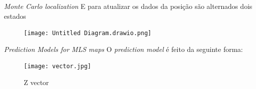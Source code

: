 \begin{frame}[c]{\textit{Monte Carlo localization}}
    E para atualizar os dados da posição são alternados dois estados
    \newline

    \begin{center}
        \begin{figure}
            \texttt{[image: Untitled Diagram.drawio.png]}
        \end{figure}
    \end{center}

\end{frame}


\begin{frame}[c]{\textit{Prediction Models for MLS maps}}
    O \textit{prediction model} é feito da seguinte forma:

        \begin{center}
            \begin{figure}
                \texttt{[image: vector.jpg]}
                \caption{Z vector \cite{article}}
            \end{figure}
        \end{center}

\end{frame}

